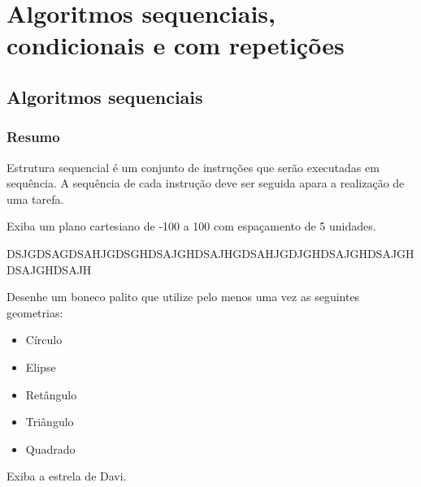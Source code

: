 
\part[Algoritmos sequenciais, condicionais e com repetições]
{Algoritmos sequenciais, condicionais e com repetições}


\chapter[Algoritmos sequenciais]
{Algoritmos sequenciais}
\label{cap:cap01}



\section{Resumo}

Estrutura sequencial é um conjunto de instruções que serão executadas em sequência. A sequência de cada instrução deve ser seguida apara a realização de uma tarefa.


%
%







\begin{problems}
\prob
Exiba um plano cartesiano de -100 a 100 com espaçamento de 5 unidades.
\label{ex:cap01_ex1}

\begin{sol}
DSJGDSAGDSAHJGDSGHDSAJGHDSAJHGDSAHJGDJGHDSAJGHDSAJGHDSAJGHDSAJH
\end{sol}

\prob
Desenhe um boneco palito que utilize pelo menos uma vez as seguintes geometrias:
\begin{itemize}
\item
Círculo
\item
Elipse
\item
Retângulo
\item
Triângulo
\item
Quadrado
\end{itemize}
\label{ex:cap01_ex2}
\prob
Exiba a estrela de Davi.
\label{ex:cap01_ex3}
\end{problems}


